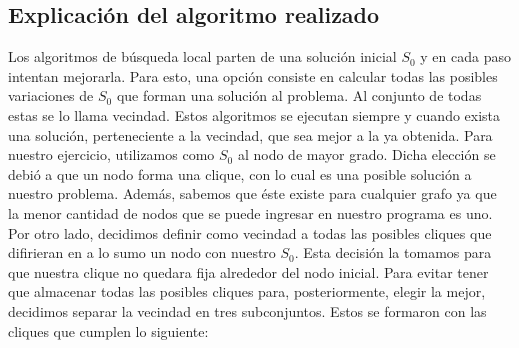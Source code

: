 \subsection{Explicación del algoritmo realizado}
Los algoritmos de búsqueda local parten de una solución inicial $S_{0}$ y en cada paso intentan mejorarla. Para esto, una opción consiste en calcular todas las posibles variaciones de $S_{0}$ que forman una solución al problema. Al conjunto de todas estas se lo llama vecindad. 
Estos algoritmos se ejecutan siempre y cuando exista una solución, perteneciente a la vecindad, que sea mejor a la ya obtenida.\newline
\newline
Para nuestro ejercicio, utilizamos como $S_{0}$ al nodo de mayor grado. Dicha elección se debió a que un nodo forma una clique, con lo cual es una posible solución a nuestro problema. Además, sabemos que éste existe para cualquier grafo ya que la menor cantidad de nodos que se puede ingresar en nuestro programa es uno. 
\newline Por otro lado, decidimos definir como vecindad a todas las posibles cliques que difirieran en a lo sumo un nodo con nuestro $S_{0}$. Esta decisión la tomamos para que nuestra clique no quedara fija alrededor del nodo inicial. Para evitar tener que almacenar todas las posibles cliques para, posteriormente, elegir la mejor, decidimos separar la vecindad en tres subconjuntos. Estos se formaron con las cliques que cumplen lo siguiente:
